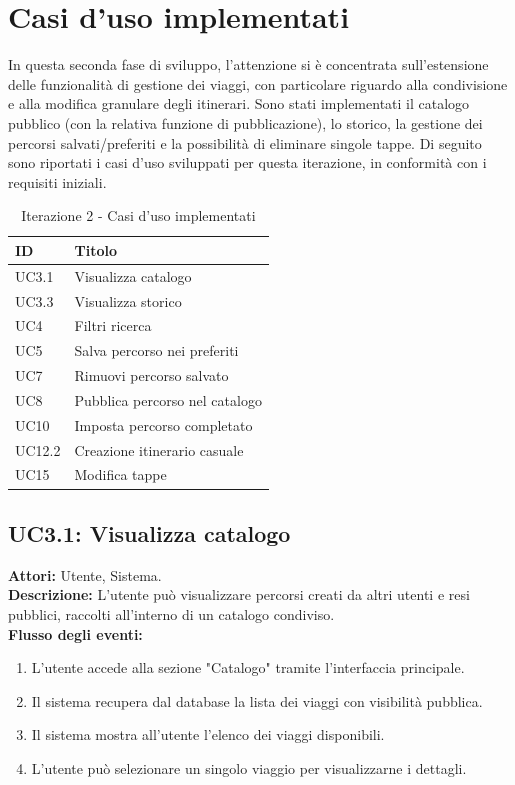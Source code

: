 \section{Casi d'uso implementati}
In questa seconda fase di sviluppo, l'attenzione si è concentrata sull'estensione delle funzionalità di gestione dei viaggi, con particolare riguardo alla condivisione e alla modifica granulare degli itinerari. Sono stati implementati il catalogo pubblico (con la relativa funzione di pubblicazione), lo storico, la gestione dei percorsi salvati/preferiti e la possibilità di eliminare singole tappe. Di seguito sono riportati i casi d'uso sviluppati per questa iterazione, in conformità con i requisiti iniziali.

\begin{table}[htbp]
\centering
\renewcommand{\arraystretch}{1.2}
\begin{tabular}{|l|l|}
\hline
\textbf{ID} & \textbf{Titolo} \\
\hline
UC3.1 & Visualizza catalogo \\
\hline
UC3.3 & Visualizza storico \\
\hline
UC4 & Filtri ricerca \\
\hline
UC5 & Salva percorso nei preferiti \\
\hline
UC7 & Rimuovi percorso salvato \\
\hline
UC8 & Pubblica percorso nel catalogo \\
\hline
UC10 & Imposta percorso completato \\
\hline
UC12.2 & Creazione itinerario casuale \\
\hline
UC15 & Modifica tappe \\
\hline
\end{tabular}
\caption{Iterazione 2 - Casi d'uso implementati}
\label{tab:casi_uso_iterazione2}
\end{table}

\subsection*{UC3.1: Visualizza catalogo}
\textbf{Attori:} Utente, Sistema.\\
\textbf{Descrizione:} L'utente può visualizzare percorsi creati da altri utenti e resi pubblici, raccolti all'interno di un catalogo condiviso.\\
\textbf{Flusso degli eventi:}
\begin{enumerate}
    \item L'utente accede alla sezione "Catalogo" tramite l'interfaccia principale.
    \item Il sistema recupera dal database la lista dei viaggi con visibilità pubblica.
    \item Il sistema mostra all'utente l'elenco dei viaggi disponibili.
    \item L'utente può selezionare un singolo viaggio per visualizzarne i dettagli.
\end{enumerate}

